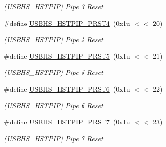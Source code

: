 \begin{DoxyCompactItemize}
\begin{DoxyCompactList}\small\item\em (U\+S\+B\+H\+S\+\_\+\+H\+S\+T\+P\+IP) Pipe 3 Reset \end{DoxyCompactList}\item 
\mbox{\label{group__SAMS70__USBHS_gae4594e7ba0e892fabce26a24a6ab993f}} 
\#define \mbox{\hyperlink{group__SAMS70__USBHS_gae4594e7ba0e892fabce26a24a6ab993f}{U\+S\+B\+H\+S\+\_\+\+H\+S\+T\+P\+I\+P\+\_\+\+P\+R\+S\+T4}}~(0x1u $<$$<$ 20)
\begin{DoxyCompactList}\small\item\em (U\+S\+B\+H\+S\+\_\+\+H\+S\+T\+P\+IP) Pipe 4 Reset \end{DoxyCompactList}\item 
\mbox{\label{group__SAMS70__USBHS_gaf22e342854890cef8d7fd408e52325c5}} 
\#define \mbox{\hyperlink{group__SAMS70__USBHS_gaf22e342854890cef8d7fd408e52325c5}{U\+S\+B\+H\+S\+\_\+\+H\+S\+T\+P\+I\+P\+\_\+\+P\+R\+S\+T5}}~(0x1u $<$$<$ 21)
\begin{DoxyCompactList}\small\item\em (U\+S\+B\+H\+S\+\_\+\+H\+S\+T\+P\+IP) Pipe 5 Reset \end{DoxyCompactList}\item 
\mbox{\label{group__SAMS70__USBHS_ga91e41af494149ed687a3e2798d30fca9}} 
\#define \mbox{\hyperlink{group__SAMS70__USBHS_ga91e41af494149ed687a3e2798d30fca9}{U\+S\+B\+H\+S\+\_\+\+H\+S\+T\+P\+I\+P\+\_\+\+P\+R\+S\+T6}}~(0x1u $<$$<$ 22)
\begin{DoxyCompactList}\small\item\em (U\+S\+B\+H\+S\+\_\+\+H\+S\+T\+P\+IP) Pipe 6 Reset \end{DoxyCompactList}\item 
\mbox{\label{group__SAMS70__USBHS_gaa3f06c94b3c0c887f0e9242db7b81f78}} 
\#define \mbox{\hyperlink{group__SAMS70__USBHS_gaa3f06c94b3c0c887f0e9242db7b81f78}{U\+S\+B\+H\+S\+\_\+\+H\+S\+T\+P\+I\+P\+\_\+\+P\+R\+S\+T7}}~(0x1u $<$$<$ 23)
\begin{DoxyCompactList}\small\item\em (U\+S\+B\+H\+S\+\_\+\+H\+S\+T\+P\+IP) Pipe 7 Reset \end{DoxyCompactList}\item 
\mbox{\label{group__SAMS70__USBHS_ga7da6e19c73db3010526a8d3a42c4d49e}} 

\end{DoxyCompactItemize}
